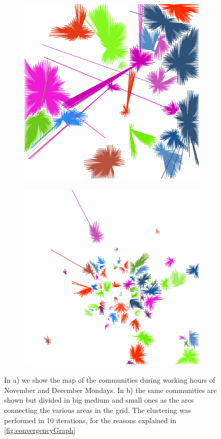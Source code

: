 \documentclass[12pt,a4paper]{article}
\begin{document}
\begin{figure}[H]
\begin{subfigure}[b]{0.3\textwidth}
\includegraphics[width=\textwidth]{weekDef/edges-1Mon-mid.png}
\end{subfigure}
\begin{subfigure}[b]{0.3\textwidth}
\includegraphics[width=\textwidth]{weekDef/edges-1Mon-small.png}
\end{subfigure}

\caption{In a) we show the map of the communities during working hours of November and December Mondays. 
In b) the same communities are shown but divided in big medium and small ones as the arcs connecting the various areas in the grid.
The clustering was performed in 10 iterations, for the reasons explained in \ref{fig:convergencyGraph}}
\label{fig:mondayworking}
\end{figure}
\end{document}
